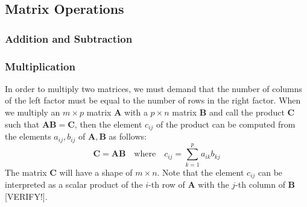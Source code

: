 




\subsection{Matrix Operations}
\subsubsection{Addition and Subtraction}

\subsubsection{Multiplication} In order to multiply two matrices, we must demand that the number of columns of the left factor must be equal to the number of rows in the right factor. When we multiply an $m \times p$ matrix $\mathbf{A}$ with a $p \times n$ matrix $\mathbf{B}$ and call the product $\mathbf{C}$ such that $\mathbf{A} \mathbf{B} = \mathbf{C}$, then the element $c_{ij}$ of the product can be computed from the elements $a_{ij}, b_{ij}$ of $\mathbf{A}, \mathbf{B}$ as follows:
\begin{equation}
 \mathbf{C} = \mathbf{A} \mathbf{B} 
 \quad \text{where} \quad
 c_{ij} = \sum_{k=1}^p a_{ik} b_{kj}
\end{equation}
The matrix $\mathbf{C}$ will have a shape of $m \times n$. Note that the element $c_{ij}$ can be interpreted as a scalar product of the $i$-th row of $\mathbf{A}$ with the $j$-th column of  $\mathbf{B}$ [VERIFY!].

